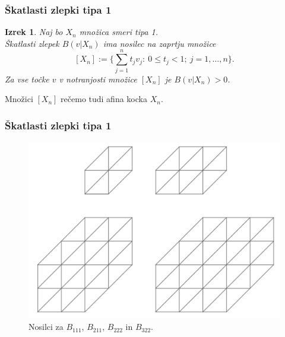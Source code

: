 \documentclass{beamer}
\newtheorem{izrek}{Izrek}
\begin{document}

\begin{frame}
\frametitle{Škatlasti zlepki tipa 1}

\begin{izrek}
Naj bo $X_n$ množica smeri tipa 1.\\
Škatlasti zlepek $B(v|X_n)$ ima nosilec na zaprtju množice
$$[X_n] := \{ \sum_{j=1}^n t_j v_j : \ 0 \leq t_j < 1; \ j = 1, \ldots, n\}.$$
Za vse točke $v$ v notranjosti množice $[X_n]$ je $B(v|X_n) > 0$.
\end{izrek}

\vspace{5mm}

Množici $[X_n]$ rečemo tudi afina kocka $X_n$.
\end{frame}


\begin{frame}
\frametitle{Škatlasti zlepki tipa 1}

\begin{figure}
    \centering
    \includegraphics[scale=0.32]{nosilci}
    \caption{Nosilci za $B_{111}$, $B_{211}$, $B_{222}$ in $B_{322}$.}
\end{figure}

\end{frame}

\end{document}
